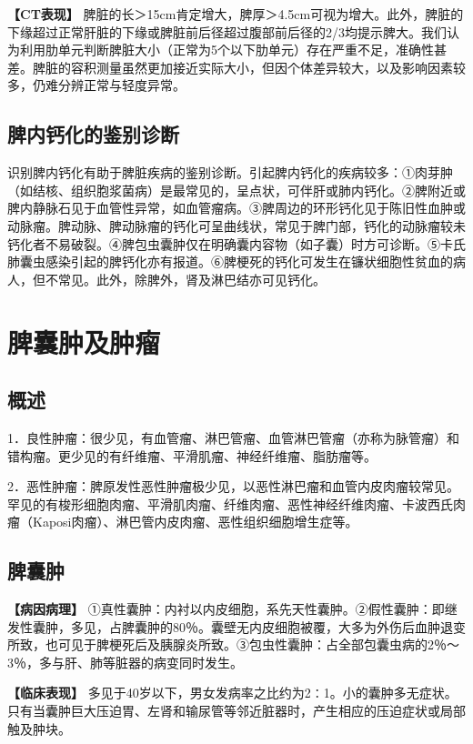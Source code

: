 \textbf{【CT表现】}
脾脏的长＞15cm肯定增大，脾厚＞4.5cm可视为增大。此外，脾脏的下缘超过正常肝脏的下缘或脾脏前后径超过腹部前后径的2/3均提示脾大。我们认为利用肋单元判断脾脏大小（正常为5个以下肋单元）存在严重不足，准确性甚差。脾脏的容积测量虽然更加接近实际大小，但因个体差异较大，以及影响因素较多，仍难分辨正常与轻度异常。

\subsection{脾内钙化的鉴别诊断}

识别脾内钙化有助于脾脏疾病的鉴别诊断。引起脾内钙化的疾病较多：①肉芽肿（如结核、组织胞浆菌病）是最常见的，呈点状，可伴肝或肺内钙化。②脾附近或脾内静脉石见于血管性异常，如血管瘤病。③脾周边的环形钙化见于陈旧性血肿或动脉瘤。脾动脉、脾动脉瘤的钙化可呈曲线状，常见于脾门部，钙化的动脉瘤较未钙化者不易破裂。④脾包虫囊肿仅在明确囊内容物（如子囊）时方可诊断。⑤卡氏肺囊虫感染引起的脾钙化亦有报道。⑥脾梗死的钙化可发生在镰状细胞性贫血的病人，但不常见。此外，除脾外，肾及淋巴结亦可见钙化。

\section{脾囊肿及肿瘤}

\subsection{概述}

1．良性肿瘤：很少见，有血管瘤、淋巴管瘤、血管淋巴管瘤（亦称为脉管瘤）和错构瘤。更少见的有纤维瘤、平滑肌瘤、神经纤维瘤、脂肪瘤等。

2．恶性肿瘤：脾原发性恶性肿瘤极少见，以恶性淋巴瘤和血管内皮肉瘤较常见。罕见的有梭形细胞肉瘤、平滑肌肉瘤、纤维肉瘤、恶性神经纤维肉瘤、卡波西氏肉瘤（Kaposi肉瘤）、淋巴管内皮肉瘤、恶性组织细胞增生症等。

\subsection{脾囊肿}

\textbf{【病因病理】}
①真性囊肿：内衬以内皮细胞，系先天性囊肿。②假性囊肿：即继发性囊肿，多见，占脾囊肿的80％。囊壁无内皮细胞被覆，大多为外伤后血肿退变所致，也可见于脾梗死后及胰腺炎所致。③包虫性囊肿：占全部包囊虫病的2％～3％，多与肝、肺等脏器的病变同时发生。

\textbf{【临床表现】}
多见于40岁以下，男女发病率之比约为2∶1。小的囊肿多无症状。只有当囊肿巨大压迫胃、左肾和输尿管等邻近脏器时，产生相应的压迫症状或局部触及肿块。

